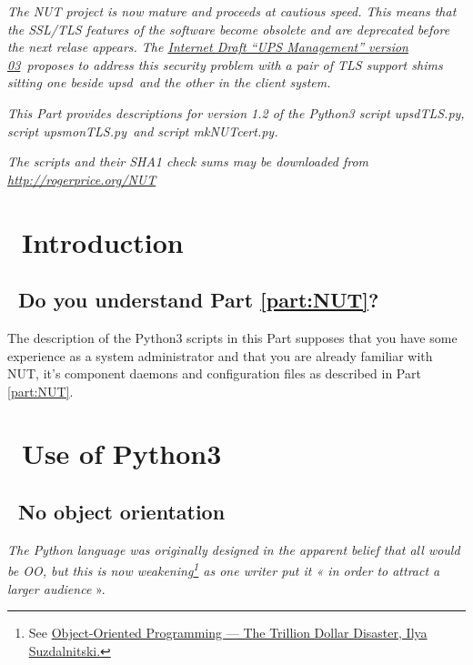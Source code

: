 \documentclass[12pt]{article}
\newlength{\headersep}\setlength{\headersep}{3mm}
\newcommand{\Hsep}{\hspace{\headersep}}
\newcommand{\newcolumn}{\vfill\eject}
\newcommand{\upsd}{\mbox{\textcolor{UPSDCOLOUR}{upsd}}}
\newcommand{\mkNUTcert}{\mbox{\textcolor{MKNUTCERTCOLOUR}{mkNUTcert.py}}}
\newcommand{\upsdTLS}{\mbox{\textcolor{UPSDCOLOUR}{upsdTLS.py}}}
\newcommand{\upsmonTLS}{\mbox{\textcolor{UPSMONCOLOUR}{upsmonTLS.py}}}
\newcommand{\RFC}{\href{https://tools.ietf.org/id/draft-rprice-ups-management-protocol-03.html}%
                       {Internet Draft ``UPS Management'' version 03}}
\begin{document}
\textit{The NUT project is now mature and proceeds at cautious speed.  This
  means that the SSL/TLS features of the software become obsolete and are
  deprecated before the next relase appears.  The \RFC\ proposes to address
  this security problem with a pair of TLS support shims sitting one beside
  \upsd\ and the other in the client system.}

\textit{This Part provides descriptions for version 1.2 of the Python3 script
  \upsdTLS, script \upsmonTLS\ and script \mkNUTcert.}

\textit{The scripts and their SHA1 check sums may be downloaded from
        \href{rogerprice.org/NUT}{http://rogerprice.org/NUT}}

\vspace{10mm}

\section{\Hsep\ Introduction}\label{section:pyIntro}

\subsection{\Hsep\ Do you understand Part \ref{part:NUT}?}\label{section:pyIntro1}

The description of the Python3 scripts in this Part supposes that you have
some experience as a system administrator and that you are already familiar
with NUT, it's component daemons and configuration files as described in Part
\ref{part:NUT}.

\section{\Hsep\ Use of Python3}\label{section:pyUse}

\subsection{\Hsep\ No object orientation}\label{section:OO}

\textit{The Python language was originally designed in the apparent
belief that all would be OO, but this is now weakening\footnote{ See
  \href{https://medium.com/better-programming/object-oriented-programming-the-trillion-dollar-disaster-92a4b666c7c7}%
       {Object-Oriented Programming — The Trillion Dollar Disaster, Ilya
         Suzdalnitski.}}  as one writer put it « in order to attract a
    larger audience} ».
\end{document}
